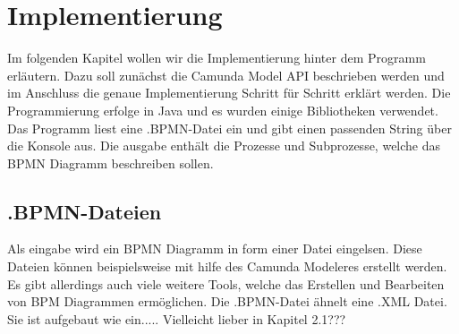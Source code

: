 
\chapter{Implementierung} %

\label{Chapter4} %

Im folgenden Kapitel wollen wir die Implementierung hinter dem Programm erläutern. Dazu soll zunächst die Camunda Model API beschrieben werden und im Anschluss die genaue Implementierung Schritt für Schritt erklärt werden.
Die Programmierung erfolge in Java und es wurden einige Bibliotheken verwendet. Das Programm liest eine .BPMN-Datei ein und gibt einen passenden String über die Konsole aus. Die ausgabe enthält die Prozesse und Subprozesse, welche das BPMN Diagramm beschreiben sollen.
\section {.BPMN-Dateien}\label{.BPMN-Dateien}
Als eingabe wird ein BPMN Diagramm in form einer Datei eingelsen. Diese Dateien können beispielsweise mit hilfe des Camunda Modeleres erstellt werden. Es gibt allerdings auch viele weitere Tools, welche das Erstellen und Bearbeiten von BPM Diagrammen ermöglichen. Die .BPMN-Datei ähnelt eine .XML Datei. Sie ist aufgebaut wie ein..... Vielleicht lieber in Kapitel 2.1???
